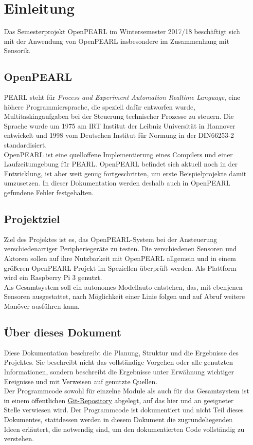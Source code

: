 \chapter{Einleitung}

	Das Semesterprojekt OpenPEARL im Wintersemester 2017/18 beschäftigt sich mit der Anwendung von OpenPEARL insbesondere im Zusammenhang mit Sensorik. 
	
	\section{OpenPEARL}
	PEARL steht für \emph{Process and Experiment Automation Realtime Language}, eine höhere Programmiersprache, die speziell dafür entworfen wurde, Multitaskingaufgaben bei der Steuerung technischer Prozesse zu steuern. Die Sprache wurde um 1975 am IRT Institut der Leibniz Universität in Hannover entwickelt und 1998 vom Deutschen Institut für Normung in der DIN66253-2 standardisiert.\\
	OpenPEARL ist eine quelloffene Implementierung eines Compilers und einer Laufzeitumgebung für PEARL. OpenPEARL befindet sich aktuell noch in der Entwicklung, ist aber weit genug fortgeschritten, um erste Beispielprojekte damit umzusetzen. In dieser Dokumentation werden deshalb auch in OpenPEARL gefundene Fehler festgehalten.
	
	\section{Projektziel}
	Ziel des Projektes ist es, das OpenPEARL-System bei der Ansteuerung verschiedenartiger Peripheriegeräte zu testen. Die verschiedenen Sensoren und Aktoren sollen auf ihre Nutzbarkeit mit OpenPEARL allgemein und in einem größeren OpenPEARL-Projekt im Speziellen überprüft werden. Als Plattform wird ein Raspberry Pi 3 genutzt. \\
	Als Gesamtsystem soll ein autonomes Modellauto entstehen, das, mit ebenjenen Sensoren ausgestattet, nach Möglichkeit einer Linie folgen und auf Abruf weitere Manöver ausführen kann.
	
	\section{Über dieses Dokument}
	Diese Dokumentation beschreibt die Planung, Struktur und die Ergebnisse des Projektes. Sie beschreibt nicht das vollständige Vorgehen oder alle genutzten Informationen, sondern beschreibt die Ergebnisse unter Erwähnung wichtiger Ereignisse und mit Verweisen auf genutzte Quellen. \\
	Der Programmcode sowohl für einzelne Module als auch für das Gesamtsystem ist in einem öffentlichen \href{https://github.com/OpenPearl-HFUWPV1718/SensorCar}{Git-Repository} abgelegt, auf das hier und an geeigneter Stelle verwiesen wird. Der Programmcode ist dokumentiert und nicht Teil dieses Dokumentes, stattdessen werden in diesem Dokument die zugrundeliegenden Ideen erläutert, die notwendig sind, um den dokumentierten Code vollständig zu verstehen.
	
	
	